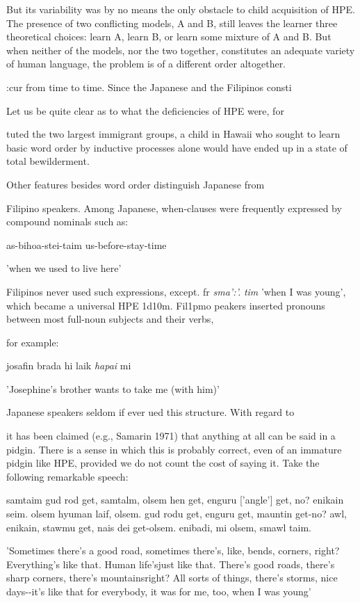 But its variability was by no means the only obstacle to child acquisition of HPE. The presence of two conflicting models, A and B, still leaves the learner three theoretical choices: learn A, learn B, or learn some mixture of A and B. But when neither of the models, nor the two together, constitutes an adequate variety of human language, the problem is of a different order altogether.

:cur from time to time. Since the Japanese and the Filipinos consti\-

Let us be quite clear as to what the deficiencies of HPE were, for

tuted the two largest immigrant groups, a child in Hawaii who sought to learn basic word order by inductive processes alone would have ended up in a state of total bewilderment.

Other features besides word order distinguish Japanese from

Filipino speakers. Among Japanese, when-clauses were frequently expressed by compound nominals such as:

\ea\label{ex:10}
 as-bihoa-stei-taim us-before-stay-time
\glt
\z

'when we used to live here'

Filipinos never used such expressions, except. fr \textit{sma':'.} \textit{tim} 'when I was young', which became a universal HPE 1d10m. Fil1pmo peakers inserted pronouns between most full-noun subjects and their verbs,

for example:

\ea\label{ex:11}
josafin brada hi laik \textit{hapai} mi
\glt
\z

'Josephine's brother wants to take me (with him)'

Japanese speakers seldom if ever ued this structure. With regard to

it has been claimed (e.g., Samarin 1971) that anything at all can be said in a pidgin. There is a sense in which this is probably correct, even of an immature pidgin like HPE, provided we do not count the cost of saying it. Take the following remarkable speech:

\ea\label{ex:12}
 samtaim gud rod get, samtalm, olsem hen get, enguru ['angle'] get, no? enikain seim. olsem hyuman laif, olsem. gud rodu get, enguru get, mauntin get-no? awl, enikain, stawmu get, nais dei get-olsem. enibadi, mi olsem, smawl taim.
\glt
\z

'Sometimes there's a good road, sometimes there's, like, bends, corners, right? Everything's like that. Human life'sjust like that. There's good roads, there's sharp corners, there's mountains\-right? All sorts of things, there's storms, nice days-{}-it's like that for everybody, it was for me, too, when I was young'

